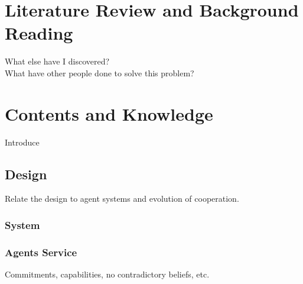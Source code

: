 \documentclass[]{final_report}
\begin{document}
\chapter{Literature Review and Background Reading}
What else have I discovered?\\
What have other people done to solve this problem?~\cite{Mui:2002:NRM:544741.544807}

\chapter{Contents and Knowledge}
Introduce
\section{Design}
Relate the design to agent systems and evolution of cooperation.	
\subsection{System}

\subsection{Agents Service}
Commitments, capabilities, no contradictory beliefs, etc.\\
\end{document}
